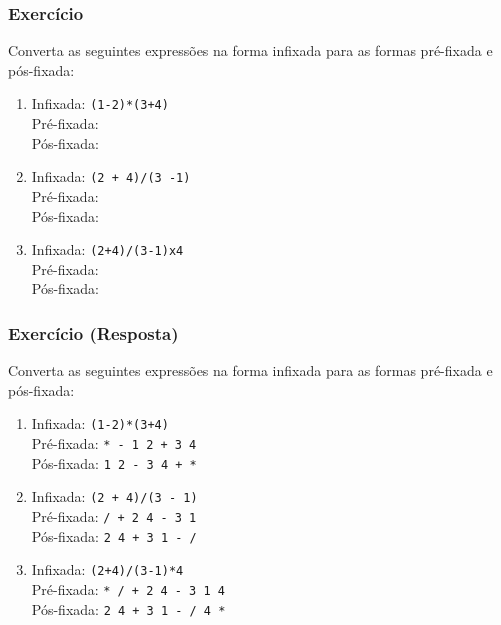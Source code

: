 \documentclass[aspectratio=169]{beamer}
\begin{document}
\begin{frame}\frametitle{Exercício}
Converta as seguintes expressões na forma infixada para as formas pré-fixada e pós-fixada:
\begin{enumerate}
	\item	Infixada: \texttt{(1-2)*(3+4)}\\
		Pré-fixada: \\
		Pós-fixada: \\
	\item	Infixada: \texttt{(2 + 4)/(3 -1)}\\
		Pré-fixada: \\
		Pós-fixada: \\
	\item	Infixada: \texttt{(2+4)/(3-1)x4}\\
		Pré-fixada: \\
		Pós-fixada: \\
\end{enumerate}
\end{frame}

\begin{frame}\frametitle{Exercício (Resposta)}
Converta as seguintes expressões na forma infixada para as formas pré-fixada e pós-fixada:
\begin{enumerate}
	\item	Infixada: \texttt{(1-2)*(3+4)}\\
		Pré-fixada: \texttt{* - 1 2 + 3 4}\\
		Pós-fixada: \texttt{1 2 - 3 4 + *}\\
	\item	Infixada: \texttt{(2 + 4)/(3 - 1)}\\
		Pré-fixada: \texttt{/ + 2 4 - 3 1}\\
		Pós-fixada: \texttt{2 4 + 3 1 - /}\\
	\item	Infixada: \texttt{(2+4)/(3-1)*4}\\
		Pré-fixada: \texttt{* / + 2 4 - 3 1 4}\\
		Pós-fixada: \texttt{2 4 + 3 1 - / 4 *}\\
\end{enumerate}
\end{frame}	
\end{document}
